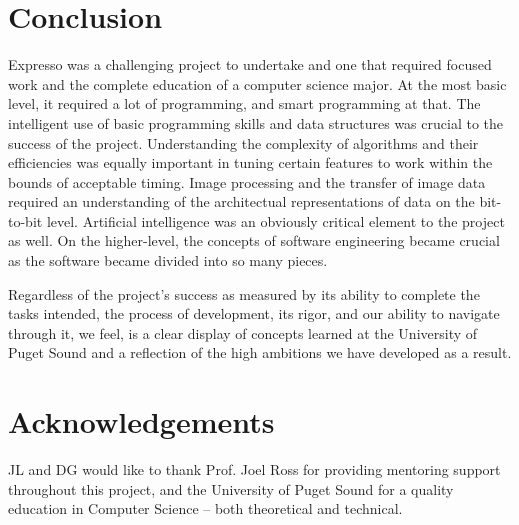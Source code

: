 \documentclass{acm_proc_article-sp}
\begin{document}
\section{Conclusion}
Expresso was a challenging project to undertake and one that required focused work and the complete education of a computer science major. At the most basic level, it required a lot of programming, and smart programming at that. The intelligent use of basic programming skills and data structures was crucial to the success of the project. Understanding the complexity of algorithms and their efficiencies was equally important in tuning certain features to work within the bounds of acceptable timing. Image processing and the transfer of image data required an understanding of the architectual representations of data on the bit-to-bit level. Artificial intelligence was an obviously critical element to the project as well. On the higher-level, the concepts of software engineering became crucial as the software became divided into so many pieces. 

Regardless of the project's success as measured by its ability to complete the tasks intended, the process of development, its rigor, and our ability to navigate through it, we feel, is a clear display of concepts learned at the University of Puget Sound and a reflection of the high ambitions we have developed as a result.

\section{Acknowledgements}
JL and DG would like to thank Prof. Joel Ross for providing mentoring support throughout this project, and the University of Puget Sound for a quality education in Computer Science -- both theoretical and technical.



  
%
%


\balancecolumns

\end{document}
